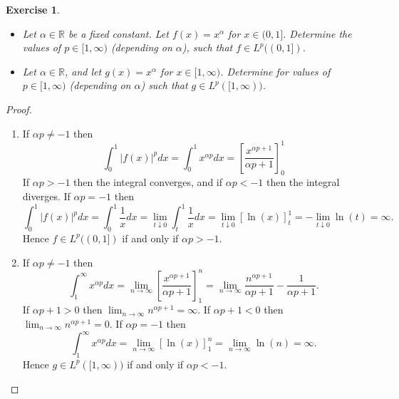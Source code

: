 \documentclass{article}
\newtheorem{exercise}[theorem]{Exercise}
\begin{document}
\begin{exercise}
\begin{itemize}
    \item[(a)] Let $\alpha \in \mathbb{R}$ be a fixed constant. Let $f(x)=x^\alpha$ for $x\in (0,1]$. Determine the values of $p\in [1,\infty)$ (depending on $\alpha$), such that $f\in L^p((0,1])$.
    \item[(b)] Let $\alpha \in \mathbb{R}$, and let $g(x) = x^{\alpha}$ for $x \in [1,\infty)$. Determine for values of $p\in[1,\infty)$ (depending on $\alpha$) such that $g\in L^p([1,\infty))$.
\end{itemize}
\end{exercise}
\begin{proof}
\begin{enumerate}
    \item[(a)] If $\alpha p\neq -1$ then\[\int_0^1|f(x)|^pdx=\int_0^1x^{\alpha p}dx=[\frac{x^{\alpha p+1}}{\alpha p+1}]_0^1\]If $\alpha p > -1$ then the integral converges, and if $\alpha p < -1$ then the integral diverges. If $\alpha p=-1$ then\[\int_0^1|f(x)|^pdx=\int_0^1\frac{1}{x}dx=\lim_{t\downarrow0}\int_t^1\frac{1}{x}dx=\lim_{t\downarrow 0}[\ln(x)]_t^1=-\lim_{t\downarrow0}\ln(t)=\infty.\] Hence $f\in L^p((0,1])$ if and only if $\alpha p> -1$.
    \item[(b)] If $\alpha p\neq -1$ then\[\int_1^\infty x^{\alpha p}dx=\lim_{n\to\infty}[\frac{x^{\alpha p+1}}{\alpha p +1}]_1^n=\lim_{n\to\infty}\frac{n^{\alpha p+1}}{\alpha p+1}-\frac{1}{\alpha p +1}.\] If $\alpha p+1>0$ then $\lim_{n\to\infty}n^{\alpha p+1}=\infty$. If $\alpha p+1<0$ then $\lim_{n\to\infty}n^{\alpha p+1}=0$. If $\alpha p =-1$ then\[\int_1^\infty x^{\alpha p}dx=\lim_{n\to\infty}[\ln(x)]_1^n=\lim_{n\to\infty}\ln(n)=\infty.\] Hence $g\in L^p([1,\infty))$ if and only if $\alpha p < -1$.
\end{enumerate}
\end{proof}
\end{document}
